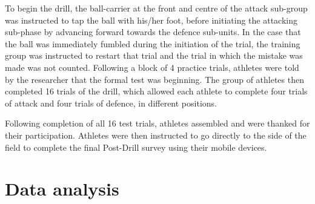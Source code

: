 To begin the drill, the ball-carrier at the front and centre of the attack sub-group was instructed to tap the ball with his/her foot, before initiating the attacking sub-phase by advancing forward towards the defence sub-units.  In the case that the ball was immediately fumbled during the initiation of the trial, the training group was instructed to restart that trial and the trial in which the mistake was made was not counted.  Following a block of 4 practice trials, athletes were told by the researcher that the formal test was beginning.  The group of athletes then completed 16 trials of the drill, which allowed each athlete to complete four trials of attack and four trials of defence, in different positions.


Following completion of all 16 test trials, athletes assembled and were thanked for their participation.  Athletes were then instructed to go directly to the side of the field to complete the final Post-Drill survey using their mobile devices.




\clearpage
\section{Data analysis}

